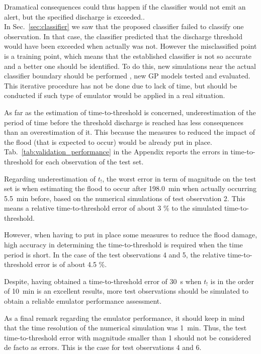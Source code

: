Dramatical consequences could thus happen if the classifier would not emit an alert, but the specified discharge is exceeded..\\

In Sec.~\ref{sec:classifier} we saw that the proposed classifier failed to classify one observation.
In that case, the classifier predicted that the discharge threshold would have been exceeded when actually was not. However the misclassified point is a training point, which means that the established classifier is not so accurate and a better one should be identified. 
To do this, new simulations near the actual classifier boundary should be performed , new GP models tested and evaluated. This iterative procedure has not be done due to lack of time, but should be conducted if such type of emulator would be applied in a real situation.  

As far as the estimation of time-to-threshold is concerned, underestimation of the period of time before the threshold discharge is reached has less consequences than an overestimation of it. This because the measures to reduced the impact of the flood (that is expected to occur) would be already put in place. 
Tab.~\ref{tab:validation_performance} in the Appendix reports the errors in time-to-threshold for each observation of the test set.

Regarding underestimation of $t_!$, the worst error in term of magnitude on the test set is when estimating the flood to occur after \SI{198.0}{\minute} when actually occurring \SI{5.5}{\minute} before, based on the numerical simulations of test observation 2.
This means a relative time-to-threshold error of about 3 \% to the simulated time-to-threshold. 

However, when having to put in place some measures to reduce the flood damage, high accuracy in determining the time-to-threshold is required when the time period is short. In the case of the test observations 4 and 5, the relative time-to-threshold error is of about 4.5 \%. 

Despite, having obtained a time-to-threshold error of \SI{30}{\s}  when $t_!$ is in the order of \SI{10}{\minute} is an excellent results, more test observations should be simulated to obtain a reliable emulator performance assessment.
 
As a final remark regarding the emulator performance, it should keep in mind that the time resolution of the numerical simulation was \SI{1}{\minute}. Thus, the test time-to-threshold error with magnitude smaller than 1 should not be considered de facto as errors. This is the case for test observations 4 and 6. 

